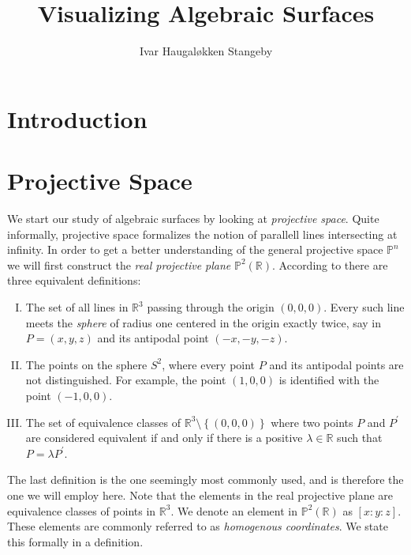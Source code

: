 \documentclass{article}
\title{Visualizing Algebraic Surfaces}
\author{Ivar Haugal{\o}kken Stangeby}
\theoremstyle{definition}
\theoremstyle{plain}
\newcommand{\proj}{\ensuremath{\mathbb{P}}} %
\newcommand{\R}{\ensuremath{\mathbb{R}}}    %
\newcommand{\projp}[3]{\ensuremath{[ #1 : #2 : #3 ]}}
\begin{document}
\maketitle


\begin{abstract}
    
\end{abstract}

\section{Introduction}
\label{sec:introduction}

\section{Projective Space}
\label{sec:projective_space}

We start our study of algebraic surfaces by looking at \emph{projective space}.
Quite informally, projective space formalizes the notion of parallell lines
intersecting at infinity. In order to get a better understanding of the general
projective space $\proj^n$ we will first construct the \emph{real projective
plane} $\proj^2(\R)$. According to \cite{Wik16}
there are three equivalent definitions:

\begin{enumerate}[I.]
    \item\label{def:one} The set of all lines in $\R^3$ passing through the origin $\left( 0,
        0, 0 \right)$. Every such line meets the \emph{sphere} of radius one
        centered in the origin exactly twice, say in $P = (x, y, z)$ and its
        antipodal point $(-x, -y, -z)$.
    \item\label{def:two} The points on the sphere $S^2$, where every point $P$ and its
        antipodal points are not distinguished. For example, the point $(1, 0,
        0)$ is identified with the point $(-1, 0, 0)$.
    \item The set of equivalence classes of $\R^3 \setminus \left\{(0, 0, 0)\right\}$ where
        two points $P$ and $P^\prime$ are considered equivalent if and only if
        there is a positive $\lambda \in \R$ such that $P = \lambda P^\prime$.
\end{enumerate}

The last definition is the one seemingly most commonly used, and is therefore
the one we will employ here. Note that the elements in the real projective
plane are equivalence classes of points in $\R^3$. We denote an element in
$\proj^2(\R)$ as $\projp{x}{y}{z}$. These elements are commonly referred to as
\emph{homogenous coordinates}. We state this
formally in a definition.
\end{document}
